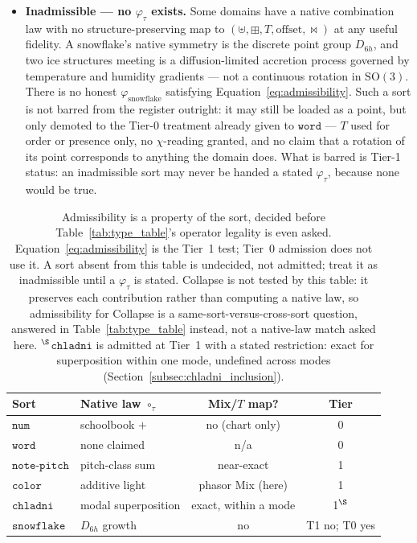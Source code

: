 \documentclass[12pt, a4paper]{article}
\begin{document}
\begin{itemize}
    \item \textbf{Inadmissible --- no $\varphi_\tau$ exists.} Some
    domains have a native combination law with no structure-preserving
    map to $(\uplus,\boxplus,T,\text{offset},\bowtie)$ at any useful fidelity.
    A snowflake's native symmetry is the discrete point group
    $D_{6h}$, and two ice structures meeting is a diffusion-limited
    accretion process governed by temperature and humidity gradients
    --- not a continuous rotation in $\mathrm{SO}(3)$. There is no
    honest $\varphi_{\mathrm{snowflake}}$ satisfying
    Equation~\eqref{eq:admissibility}. Such a sort is not barred from
    the register outright: it may still be loaded as a point, but
    only demoted to the Tier-0 treatment already given to
    $\mathtt{word}$ --- $T$ used for order or presence only, no
    $\chi$-reading granted, and no claim that a rotation of its point
    corresponds to anything the domain does. What is barred is Tier-1
    status: an inadmissible sort may never be handed a stated
    $\varphi_\tau$, because none would be true.
\end{itemize}

\begin{table}[h]
\centering
\begin{tabular}{llcc}
\hline
Sort & Native law $\circ_\tau$ & Mix/$T$ map? & Tier \\
\hline
$\mathtt{num}$   & schoolbook $+$ & no (chart only) & 0 \\
$\mathtt{word}$  & none claimed & n/a & 0 \\
$\mathtt{note\text{-}pitch}$ & pitch-class sum & near-exact & 1 \\
$\mathtt{color}$ & additive light & phasor Mix (here) & 1 \\
$\mathtt{chladni}$ & modal superposition & exact, within a mode & 1$^{\S}$ \\
$\mathtt{snowflake}$ & $D_{6h}$ growth & no & T1 no; T0 yes \\
\hline
\end{tabular}
\caption{Admissibility is a property of the sort, decided before
Table~\ref{tab:type_table}'s operator legality is even asked.
Equation~\eqref{eq:admissibility} is the Tier~1 test; Tier~0
admission does not use it. A sort
absent from this table is undecided, not admitted; treat it as
inadmissible until a $\varphi_\tau$ is stated.
Collapse is not tested by this table: it preserves each contribution
rather than computing a native law, so admissibility for Collapse is
a same-sort-versus-cross-sort question, answered in
Table~\ref{tab:type_table} instead, not a native-law match asked
here.
$^{\S}$$\mathtt{chladni}$ is admitted at Tier~1 with a stated
restriction: exact for superposition within one mode, undefined across
modes (Section~\ref{subsec:chladni_inclusion}).}
\label{tab:admissibility}
\end{table}
\end{document}
